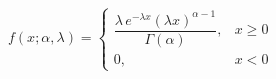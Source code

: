 \documentclass[preview]{standalone}
\begin{document}
\begin{align*}
f(x; \alpha , \lambda )=\begin{cases}\dfrac{ \lambda \,e^{- \lambda  x}( \lambda  x)^{ \alpha -1}}{\Gamma( \alpha )}, & x\ge0\\[6pt]0, & x<0\end{cases}
\end{align*}
\end{document}
